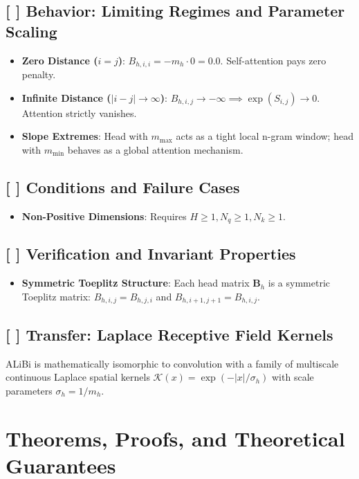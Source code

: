 \documentclass[11pt,a4paper]{article}
\theoremstyle{definition}
\begin{document}
\subsection{[ ] Behavior: Limiting Regimes and Parameter Scaling}
\begin{itemize}
    \item \textbf{Zero Distance ($i = j$)}: $B_{h, i, i} = -m_h \cdot 0 = 0.0$. Self-attention pays zero penalty.
    \item \textbf{Infinite Distance ($|i - j| \to \infty$)}: $B_{h, i, j} \to -\infty \implies \exp(S_{i, j}) \to 0$. Attention strictly vanishes.
    \item \textbf{Slope Extremes}: Head with $m_{\text{max}}$ acts as a tight local n-gram window; head with $m_{\text{min}}$ behaves as a global attention mechanism.
\end{itemize}

\subsection{[ ] Conditions and Failure Cases}
\begin{itemize}
    \item \textbf{Non-Positive Dimensions}: Requires $H \ge 1, N_q \ge 1, N_k \ge 1$.
\end{itemize}

\subsection{[ ] Verification and Invariant Properties}
\begin{itemize}
    \item \textbf{Symmetric Toeplitz Structure}: Each head matrix $\mathbf{B}_h$ is a symmetric Toeplitz matrix: $B_{h, i, j} = B_{h, j, i}$ and $B_{h, i+1, j+1} = B_{h, i, j}$.
\end{itemize}

\subsection{[ ] Transfer: Laplace Receptive Field Kernels}
ALiBi is mathematically isomorphic to convolution with a family of multiscale continuous Laplace spatial kernels $\mathcal{K}(x) = \exp(-|x| / \sigma_h)$ with scale parameters $\sigma_h = 1 / m_h$.

\section{Theorems, Proofs, and Theoretical Guarantees}
\end{document}

